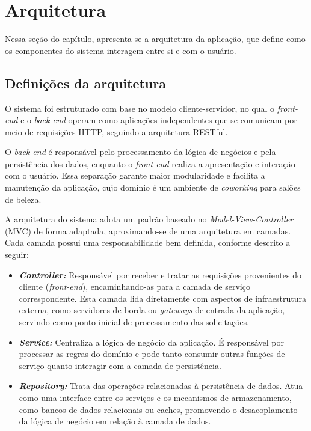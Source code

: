 \section{Arquitetura}

Nessa seção do capítulo, apresenta-se a arquitetura da aplicação, que define como os componentes do sistema interagem entre si e com o usuário.

\subsection{Definições da arquitetura}

O sistema foi estruturado com base no modelo cliente-servidor, no qual o \emph{front-end} e o \emph{back-end} operam como aplicações independentes que se comunicam por meio de requisições HTTP, seguindo a arquitetura RESTful.

O \emph{back-end} é responsável pelo processamento da lógica de negócios e pela persistência dos dados, enquanto o \emph{front-end} realiza a apresentação e interação com o usuário. Essa separação garante maior modularidade e facilita a manutenção da aplicação, cujo domínio é um ambiente de \textit{coworking} para salões de beleza.

A arquitetura do sistema adota um padrão baseado no \emph{Model-View-Controller} (MVC) de forma adaptada, aproximando-se de uma arquitetura em camadas. Cada camada possui uma responsabilidade bem definida, conforme descrito a seguir:

\begin{itemize}
  \item \textbf{\emph{Controller:}} Responsável por receber e tratar as requisições provenientes do cliente (\emph{front-end}), encaminhando-as para a camada de serviço correspondente. Esta camada lida diretamente com aspectos de infraestrutura externa,  como servidores de borda ou \emph{gateways} de entrada da aplicação, servindo como ponto inicial de processamento das solicitações.
  \item \textbf{\emph{Service:}} Centraliza a lógica de negócio da aplicação. É responsável por processar as regras do domínio e pode tanto consumir outras funções de serviço quanto interagir com a camada de persistência.
  \item \textbf{\emph{Repository:}} Trata das operações relacionadas à persistência de dados. Atua como uma interface entre os serviços e os mecanismos de armazenamento, como bancos de dados relacionais ou caches, promovendo o desacoplamento da lógica de negócio em relação à camada de dados.
\end{itemize}


